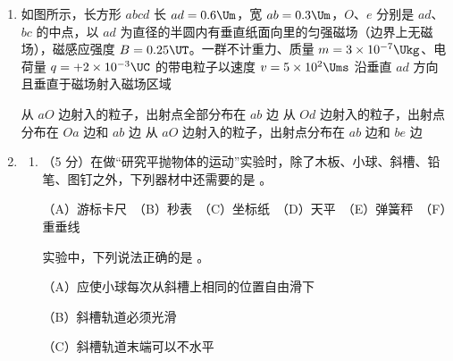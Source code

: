 \documentclass[\gkver]{gaokaozhenti}
\begin{document}
\begin{enumerate}
{figs/20b.png}

{经过 $0.25\Us$ 时，质点 $Q$ 的加速度大于质点 $P$ 的加速度}
{经过 $0.15\Us$，波沿 $x$ 轴的正方向传播了 $3\Um$}
{经过 $0.1\Us$ 时，质点 $Q$ 的运动方向沿 $y$ 轴正方向}


\item
如图所示，长方形 $abcd$ 长 $ad=0.6\Um$，宽 $ab=0.3\Um$，$O$、$e$ 分别是 $ad$、$bc$ 的中点，以 $ad$ 为直径的半圆内有垂直纸面向里的匀强磁场（边界上无磁场），磁感应强度 $B=0.25\UT$。一群不计重力、质量 $m=3\times10^{-7}\Ukg$、电荷量 $q=+2\times10^{-3}\UC$ 的带电粒子以速度 $v=5\times10^{2}\Ums$ 沿垂直 $ad$ 方向且垂直于磁场射入磁场区域


{从 $aO$ 边射入的粒子，出射点全部分布在 $ab$ 边}
{从 $Od$ 边射入的粒子，出射点分布在 $Oa$ 边和 $ab$ 边}
{从 $aO$ 边射入的粒子，出射点分布在 $ab$ 边和 $be$ 边}


\item
\begin{enumerate}
	\item
	（5 分）在做“研究平抛物体的运动”实验时，除了木板、小球、斜槽、铅笔、图钉之外，下列器材中还需要的是 。

	（A）游标卡尺　（B）秒表　（C）坐标纸　（D）天平　（E）弹簧秤　（F）重垂线

	实验中，下列说法正确的是 。

	（A）应使小球每次从斜槽上相同的位置自由滑下

	（B）斜槽轨道必须光滑

	（C）斜槽轨道末端可以不水平


\end{enumerate}
\end{enumerate}
\end{document}
